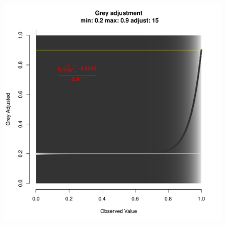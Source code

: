 \documentclass[letterpaper]{article}\usepackage[]{graphicx}\usepackage[]{color}
\newenvironment{knitrout}{}{} %
\begin{document}
\begin{figure}[h!]
\begin{minipage}[b]{0.45\linewidth}
\begin{knitrout}
{\centering \includegraphics[width=\linewidth]{figure/greywidth_large_heavy} 

}



\end{knitrout}

\end{minipage}
\end{figure}
\newpage
\end{document}
